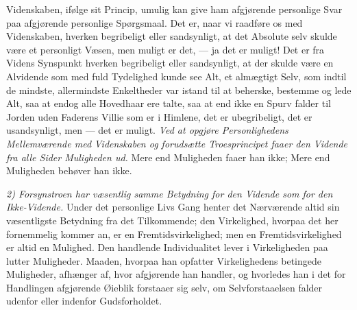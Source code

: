 \documentclass[12pt]{book}
\begin{document}
Videnskaben, ifølge sit Princip, umulig kan give ham afgjørende
personlige Svar paa afgjørende personlige Spørgsmaal. Det er, naar
vi raadføre os med Videnskaben, hverken begribeligt eller
sandsynligt, at det Absolute selv skulde være et personligt Væsen,
men muligt er det, --- ja det er muligt! Det er fra Videns Synspunkt
hverken begribeligt eller sandsynligt, at der skulde være en
Alvidende som med fuld Tydelighed kunde see Alt, et almægtigt Selv,
som indtil de mindste, allermindste Enkeltheder var istand til at
beherske, bestemme og lede Alt, saa at endog alle Hovedhaar ere
talte, saa at end ikke en Spurv falder til Jorden uden Faderens
Villie som er i Himlene, det er ubegribeligt, det er usandsynligt,
men --- det er muligt. \emph{Ved at opgjøre Personlighedens
Mellemværende med}
\emph{Videnskaben og forudsætte Troesprincipet faaer den Vidende fra
alle Sider Muligheden ud.} Mere end Muligheden faaer han ikke; Mere
end Muligheden behøver han ikke.

\emph{2) Forsynstroen har væsentlig samme Betydning for den Vidende
som for den Ikke-Vidende.} Under det personlige Livs Gang henter det
Nærværende altid sin væsentligste Betydning fra det Tilkommende; den
Virkelighed, hvorpaa det her fornemmelig kommer an, er en
Fremtidsvirkelighed; men en Fremtidsvirkelighed er altid en
Mulighed. Den handlende Individualitet lever i Virkeligheden paa
lutter Muligheder. Maaden, hvorpaa han opfatter Virkelighedens
betingede Muligheder, afhænger af, hvor afgjørende han handler, og
hvorledes han i det for Handlingen afgjørende Øieblik forstaaer sig
selv, om Selvforstaaelsen falder udenfor eller indenfor
Gudsforholdet.
\end{document}
